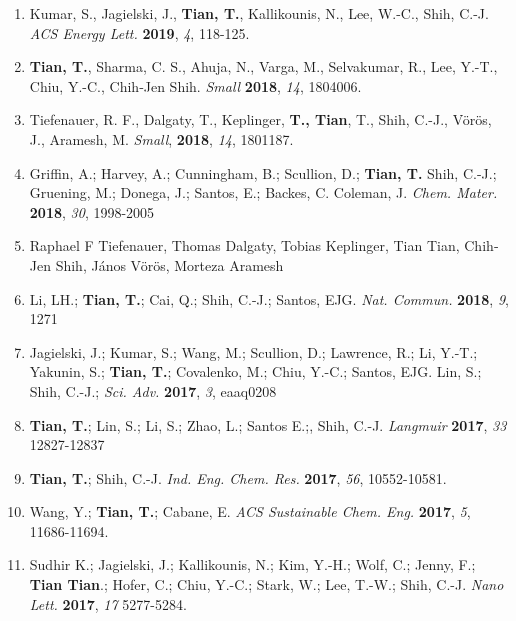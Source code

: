 \documentclass[margin]{res}
\begin{document}
\begin{resume}
\begin{enumerate}
\item Kumar, S., Jagielski, J., \textbf{Tian, T.}, Kallikounis, N.,
  Lee, W.-C., Shih, C.-J. \textit{ACS Energy Lett.}
  \textbf{2019}, \textit{4}, 118-125.

\item \textbf{Tian, T.}, Sharma, C. S., Ahuja, N.,
  Varga, M.,  Selvakumar, R., Lee, Y.-T., Chiu, Y.-C., Chih‐Jen
  Shih. \textit{Small} \textbf{2018}, \textit{14}, 1804006.

\item Tiefenauer, R. F., Dalgaty, T., Keplinger, \textbf{T., Tian}, T., Shih,
  C.-J., V\"{o}r\"{o}s, J., Aramesh, M. \textit{Small}, \textbf{2018},
  \textit{14}, 1801187.
  
\item Griffin, A.; Harvey, A.; Cunningham, B.; Scullion, D.;
  \textbf{Tian, T.} Shih, C.-J.; Gruening, M.; Donega, J.; Santos, E.;
  Backes, C. Coleman, J. \textit{Chem. Mater.} \textbf{2018},
  \textit{30}, 1998-2005

\item Raphael F Tiefenauer, Thomas Dalgaty, Tobias Keplinger, Tian
  Tian, Chih‐Jen Shih, János Vörös, Morteza Aramesh
  
\item Li, LH.; \textbf{Tian, T.}; Cai, Q.; Shih, C.-J.; Santos,
  EJG. \textit{Nat. Commun.} \textbf{2018}, \textit{9}, 1271
\item Jagielski, J.; Kumar, S.; Wang, M.; Scullion, D.; Lawrence, R.;
  Li, Y.-T.; Yakunin, S.; \textbf{Tian, T.}; Covalenko, M.; Chiu,
  Y.-C.; Santos, EJG. Lin, S.; Shih, C.-J.; \textit{Sci. Adv.}
  \textbf{2017}, \textit{3}, eaaq0208

  \item \textbf{Tian, T.}; Lin, S.; Li, S.; Zhao, L.; Santos E.;,
    Shih, C.-J. \textit{Langmuir} \textbf{2017}, \textit{33} 12827-12837
    
  \item \textbf{Tian, T.}; Shih, C.-J. \textit{Ind. Eng. Chem. Res.}
    \textbf{2017}, \textit{56}, 10552-10581.
  
  
  
  \item Wang, Y.; \textbf{Tian, T.}; Cabane, E. \textit{ACS
      Sustainable Chem. Eng.} \textbf{2017}, \textit{5}, 11686-11694.

    
  \item Sudhir K.; Jagielski, J.; Kallikounis, N.; Kim, Y.-H.; Wolf,
    C.; Jenny, F.; \textbf{Tian Tian}.; Hofer, C.; Chiu, Y.-C.; Stark,
    W.; Lee, T.-W.; Shih, C.-J. \textit{Nano Lett.} \textbf{2017},
    \textit{17} 5277-5284.
    

\end{enumerate}
\end{resume}
\end{document}
